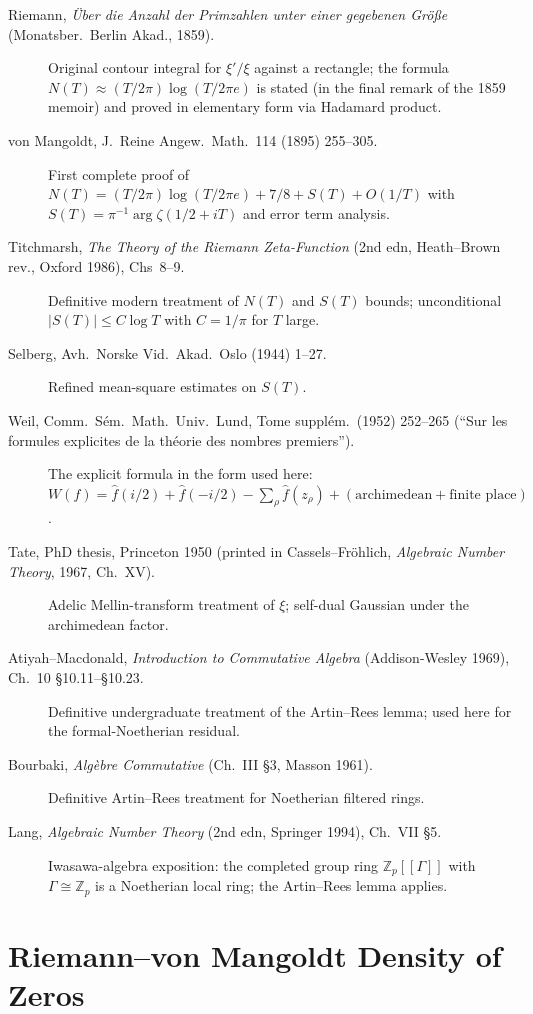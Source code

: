 \begin{description}
\item[Riemann, \emph{\"Uber die Anzahl der Primzahlen unter einer
gegebenen Gr\"o{\ss}e} (Monatsber.~Berlin Akad., 1859).] Original
contour integral for \(\xi'/\xi\) against a rectangle; the formula
\(N(T)\approx (T/2\pi)\log(T/2\pi e)\) is stated (in the final remark of
the 1859 memoir) and proved in elementary form via Hadamard product.
\item[von Mangoldt, J.~Reine Angew.~Math.~114 (1895) 255--305.]
First complete proof of
\(N(T)=(T/2\pi)\log(T/2\pi e)+7/8+S(T)+O(1/T)\) with
\(S(T)=\pi^{-1}\arg\zeta(1/2+iT)\) and error term analysis.
\item[Titchmarsh, \emph{The Theory of the Riemann Zeta-Function}
(2nd edn, Heath--Brown rev., Oxford 1986), Chs~8--9.] Definitive
modern treatment of \(N(T)\) and \(S(T)\) bounds; unconditional
\(|S(T)|\leq C\log T\) with \(C=1/\pi\) for \(T\) large.
\item[Selberg, Avh.~Norske Vid.~Akad.~Oslo (1944) 1--27.] Refined
mean-square estimates on \(S(T)\).
\item[Weil, Comm.~S\'em.~Math.~Univ.~Lund, Tome suppl\'em.~(1952)
252--265 (``Sur les formules explicites de la th\'eorie des
nombres premiers'').] The explicit formula in the form used here:
\(W(f)=\widehat{f}(i/2)+\widehat{f}(-i/2)-\sum_{\rho}\widehat{f}(z_{\rho})+
(\text{archimedean} + \text{finite place})\).
\item[Tate, PhD thesis, Princeton 1950 (printed in Cassels--Fr\"ohlich,
\emph{Algebraic Number Theory}, 1967, Ch.~XV).] Adelic
Mellin-transform treatment of \(\xi\); self-dual Gaussian under the
archimedean factor.
\item[Atiyah--Macdonald, \emph{Introduction to Commutative Algebra}
(Addison-Wesley 1969), Ch.~10 \S10.11--\S10.23.] Definitive
undergraduate treatment of the Artin--Rees lemma; used here for
the formal-Noetherian residual.
\item[Bourbaki, \emph{Alg\`ebre Commutative} (Ch.~III \S3, Masson
1961).] Definitive Artin--Rees treatment for Noetherian filtered
rings.
\item[Lang, \emph{Algebraic Number Theory} (2nd edn, Springer 1994),
Ch.~VII \S5.] Iwasawa-algebra exposition: the completed group ring
\(\mathbb{Z}_{p}[[\Gamma]]\) with \(\Gamma\cong\mathbb{Z}_{p}\) is a
Noetherian local ring; the Artin--Rees lemma applies.
\end{description}

\section{Riemann--von Mangoldt Density of Zeros}
\label{v4-arith:w5-i:rvm}

